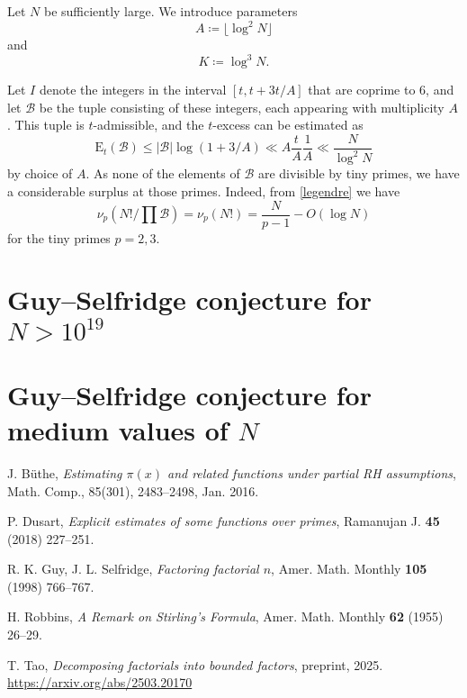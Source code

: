 \documentclass[12pt,a4paper,reqno]{amsart}
\numberwithin{equation}{section}
\theoremstyle{plain}
\theoremstyle{definition}
\newcommand\tuple{{\mathcal B}}
\newcommand\excess{{\mathrm{E}}}
\begin{document}
Let $N$ be sufficiently large.  We introduce parameters
$$ A \coloneqq \lfloor \log^2 N \rfloor$$
and
$$ K \coloneqq \log^3 N.$$

Let $I$ denote the integers in the interval $[t, t+3t/A]$ that are coprime to $6$, and let $\tuple$ be the tuple consisting of these integers, each appearing with multiplicity $A$.  This tuple is $t$-admissible, and the $t$-excess can be estimated as
$$ \excess_t(\tuple) \leq |\tuple| \log(1+3/A) \ll A \frac{t}{A} \frac{1}{A} \ll \frac{N}{\log^2 N}$$
by choice of $A$.  As none of the elements of $\tuple$ are divisible by tiny primes, we have a considerable surplus at those primes.  Indeed, from \eqref{legendre} we have
$$ \nu_p(N!/\prod \tuple) = \nu_p(N!) = \frac{N}{p-1} - O(\log N)$$
for the tiny primes $p=2,3$.





\section{Guy--Selfridge conjecture for $N > 10^{19}$}


\section{Guy--Selfridge conjecture for medium values of $N$}



\begin{thebibliography}{10}

J. B\"uthe, \emph{Estimating $\pi(x)$ and related functions under partial RH assumptions}, Math. Comp., 85(301), 2483--2498, Jan. 2016.

P. Dusart, \emph{Explicit estimates of some functions over primes}, Ramanujan J. \textbf{45} (2018) 227--251.

R. K. Guy, J. L. Selfridge, \emph{Factoring factorial $n$}, Amer. Math. Monthly \textbf{105} (1998) 766--767.

H. Robbins, \emph{A Remark on Stirling's Formula}, Amer. Math. Monthly \textbf{62} (1955) 26--29.

T. Tao, \emph{Decomposing factorials into bounded factors}, preprint, 2025. \url{https://arxiv.org/abs/2503.20170}

\end{thebibliography}
\end{document}
